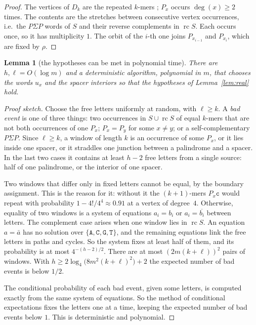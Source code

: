 \documentclass[11pt]{article}
\theoremstyle{plain}
\newtheorem{lemma}[theorem]{Lemma}
\theoremstyle{definition}
\theoremstyle{remark}
\newcommand{\rc}{\operatorname{rc}}
\begin{document}
\begin{proof}
The vertices of $D_k$ are the repeated $k$-mers \cite{Bio8}; $P_x$ occurs $\deg(x)\ge2$ times. The contents
are the stretches between consecutive vertex occurrences, i.e.\ the $P\Sigma P$ words of $S$ and their
reverse complements in $\rc S$. Each occurs once, so it has multiplicity $1$. The orbit of the $i$-th one
joins $P_{x_{i-1}}$ and $P_{x_i}$, which are fixed by $\rho$.
\end{proof}

\begin{lemma}[the hypotheses can be met in polynomial time]\label{lem:derand}
There are $h,\ell=O(\log m)$ and a deterministic algorithm, polynomial in $m$, that chooses the words $u_x$
and the spacer interiors so that the hypotheses of Lemma~\ref{lem:real} hold.
\end{lemma}

\begin{proof}[Proof sketch]
Choose the free letters uniformly at random, with $\ell\ge k$. A \emph{bad event} is one of three things:
two occurrences in $S\cup\rc S$ of equal $k$-mers that are not both occurrences of one $P_x$; $P_x=P_y$
for some $x\ne y$; or a self-complementary $P\Sigma P$. Since $\ell\ge k$, a window of length $k$ is an
occurrence of some $P_x$, or it lies inside one spacer, or it straddles one junction between a
palindrome and a spacer. In the last two cases it contains at least $h-2$ free letters from a single
source: half of one palindrome, or the interior of one spacer.

Two windows that differ only in fixed letters cannot be equal, by the boundary assignment. This is the
reason for it: without it the $(k+1)$-mers $P_x\mathtt c$ would repeat with probability
$1-4!/4^4\approx0.91$ at a vertex of degree~$4$. Otherwise, equality of two windows is a system of
equations $a_i=b_i$ or $a_i=\overline{b_i}$ between letters. The complement case arises when one
window lies in $\rc S$. An equation $a=\bar a$ has no solution over $\{\mathtt A,\mathtt C,\mathtt G,\mathtt T\}$,
and the remaining equations link the free letters in paths and cycles. So the system fixes at least half
of them, and its probability is at most $4^{-(h-2)/2}$. There are at most $(2m(k+\ell))^2$ pairs of
windows. With $h\ge 2\log_4\bigl(8m^2(k+\ell)^2\bigr)+2$ the expected number of bad events is below $1/2$.

The conditional probability of each bad event, given some letters, is computed exactly from the same
system of equations. So the method of conditional expectations fixes the letters one at a time,
keeping the expected number of bad events below $1$. This is deterministic and polynomial.
\end{proof}
\end{document}
